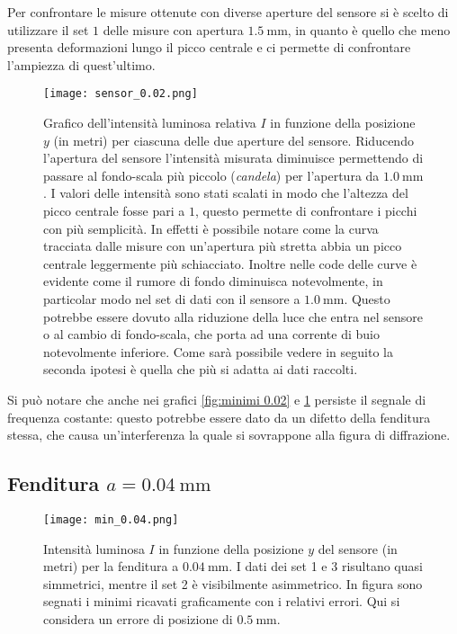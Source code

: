 \documentclass[../main.tex]{subfiles}
\begin{document}
Per confrontare le misure ottenute con diverse aperture del sensore si è scelto di utilizzare il set $1$ delle misure con apertura $\qty{1.5}{\mm}$, in quanto è quello che meno presenta deformazioni lungo il picco centrale e ci permette di confrontare l'ampiezza di quest'ultimo.

\begin{figure}[ht!]
    \centering
    \texttt{[image: sensor\_0.02.png]}
    \caption{Grafico dell'intensità luminosa relativa $I$ in funzione della posizione $y$ (in metri) per ciascuna delle due aperture del sensore.
    Riducendo l'apertura del sensore l'intensità misurata diminuisce permettendo di passare al fondo-scala più piccolo (\textit{candela}) per l'apertura da $\qty{1.0}{\mm}$.
    I valori delle intensità sono stati scalati in modo che l'altezza del picco centrale fosse pari a $1$, questo permette di confrontare i picchi con più semplicità. In effetti è possibile notare come la curva tracciata dalle misure con un'apertura più stretta abbia un picco centrale leggermente più schiacciato.
    Inoltre nelle code delle curve è evidente come il rumore di fondo diminuisca notevolmente, in particolar modo nel set di dati con il sensore a $\qty{1.0}{\mm}$. Questo potrebbe essere dovuto alla riduzione della luce che entra nel sensore o al cambio di fondo-scala, che porta ad una corrente di buio notevolmente inferiore.
    Come sarà possibile vedere in seguito la seconda ipotesi è quella che più si adatta ai dati raccolti.} %
    \label{fig:sensore 0.02}
\end{figure}

Si può notare che anche nei grafici \ref{fig:minimi 0.02} e \ref{fig:sensore 0.02} persiste il segnale di frequenza costante: questo potrebbe essere dato da un difetto della fenditura stessa, che causa un'interferenza la quale si sovrappone alla figura di diffrazione.

\newpage

\subsection{Fenditura $a = \qty{0.04}{\milli\metre}$}

\begin{figure}[ht!]
    \centering
    \texttt{[image: min\_0.04.png]}
    \caption{Intensità luminosa $I$ in funzione della posizione $y$ del sensore (in metri) per la fenditura a $\qty{0.04}{\mm}$. I dati dei set 1 e 3 risultano quasi simmetrici, mentre il set 2 è visibilmente asimmetrico. In figura sono segnati i minimi ricavati graficamente con i relativi errori. Qui si considera un errore di posizione di $\qty{0.5}{\mm}$.} %
    \label{fig:minimi 0.04}
\end{figure}
\end{document}
